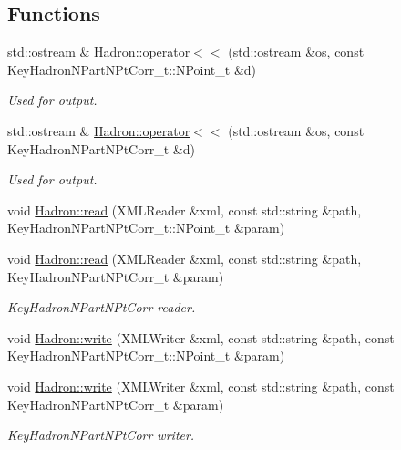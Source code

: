 \subsection*{Functions}
\begin{DoxyCompactItemize}
\item 
std\+::ostream \& \mbox{\hyperlink{namespaceHadron_aa96f2bb0448730889b5e59a58a1a62dd}{Hadron\+::operator$<$$<$}} (std\+::ostream \&os, const Key\+Hadron\+N\+Part\+N\+Pt\+Corr\+\_\+t\+::\+N\+Point\+\_\+t \&d)
\begin{DoxyCompactList}\small\item\em Used for output. \end{DoxyCompactList}\item 
std\+::ostream \& \mbox{\hyperlink{namespaceHadron_aa874bbfadc5859a87766ccbd07b10f48}{Hadron\+::operator$<$$<$}} (std\+::ostream \&os, const Key\+Hadron\+N\+Part\+N\+Pt\+Corr\+\_\+t \&d)
\begin{DoxyCompactList}\small\item\em Used for output. \end{DoxyCompactList}\item 
void \mbox{\hyperlink{namespaceHadron_aef0c0dfd0f87842b485511132f1c405f}{Hadron\+::read}} (X\+M\+L\+Reader \&xml, const std\+::string \&path, Key\+Hadron\+N\+Part\+N\+Pt\+Corr\+\_\+t\+::\+N\+Point\+\_\+t \&param)
\item 
void \mbox{\hyperlink{namespaceHadron_a85b27e940a60880e6f98fb6a939d96c2}{Hadron\+::read}} (X\+M\+L\+Reader \&xml, const std\+::string \&path, Key\+Hadron\+N\+Part\+N\+Pt\+Corr\+\_\+t \&param)
\begin{DoxyCompactList}\small\item\em Key\+Hadron\+N\+Part\+N\+Pt\+Corr reader. \end{DoxyCompactList}\item 
void \mbox{\hyperlink{namespaceHadron_af4fede7daa1a73ae6be48e039292c692}{Hadron\+::write}} (X\+M\+L\+Writer \&xml, const std\+::string \&path, const Key\+Hadron\+N\+Part\+N\+Pt\+Corr\+\_\+t\+::\+N\+Point\+\_\+t \&param)
\item 
void \mbox{\hyperlink{namespaceHadron_a295fddb7420012571f5b8115f2b25a97}{Hadron\+::write}} (X\+M\+L\+Writer \&xml, const std\+::string \&path, const Key\+Hadron\+N\+Part\+N\+Pt\+Corr\+\_\+t \&param)
\begin{DoxyCompactList}\small\item\em Key\+Hadron\+N\+Part\+N\+Pt\+Corr writer. \end{DoxyCompactList}\item 

\end{DoxyCompactItemize}
